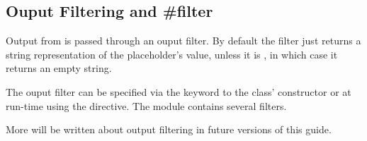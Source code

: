 \subsection{Ouput Filtering and \#filter}
\label{directives.filter}

Output from  is passed through an ouput filter.  By default
the filter just returns a string representation of the placeholder's value,
unless it is , in which case it returns an empty string. 

The ouput filter can be specified via the  keyword to the
 class' constructor or at run-time using the 
directive. The  module contains several filters.

More will be written about output filtering in future versions of this guide.




